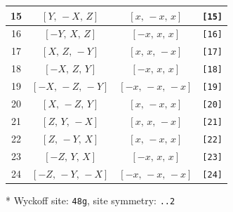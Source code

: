 \documentclass[fleqn,8pt]{jsarticle}
\begin{document}
\begin{longtable}{cccc}
15 & $\left[ Y,\, - X,\, Z \right]$ & $\left[ x,\, - x,\, x \right]$ & {\tt [15]} \\ \hline
16 & $\left[ - Y,\, X,\, Z \right]$ & $\left[ - x,\, x,\, x \right]$ & {\tt [16]} \\ \hline
17 & $\left[ X,\, Z,\, - Y \right]$ & $\left[ x,\, x,\, - x \right]$ & {\tt [17]} \\ \hline
18 & $\left[ - X,\, Z,\, Y \right]$ & $\left[ - x,\, x,\, x \right]$ & {\tt [18]} \\ \hline
19 & $\left[ - X,\, - Z,\, - Y \right]$ & $\left[ - x,\, - x,\, - x \right]$ & {\tt [19]} \\ \hline
20 & $\left[ X,\, - Z,\, Y \right]$ & $\left[ x,\, - x,\, x \right]$ & {\tt [20]} \\ \hline
21 & $\left[ Z,\, Y,\, - X \right]$ & $\left[ x,\, x,\, - x \right]$ & {\tt [21]} \\ \hline
22 & $\left[ Z,\, - Y,\, X \right]$ & $\left[ x,\, - x,\, x \right]$ & {\tt [22]} \\ \hline
23 & $\left[ - Z,\, Y,\, X \right]$ & $\left[ - x,\, x,\, x \right]$ & {\tt [23]} \\ \hline
24 & $\left[ - Z,\, - Y,\, - X \right]$ & $\left[ - x,\, - x,\, - x \right]$ & {\tt [24]} \\
\end{longtable}
* Wyckoff site: {\tt 48g}, site symmetry: {\tt ..2}
\renewcommand{\arraystretch}{1.2}
\end{document}
